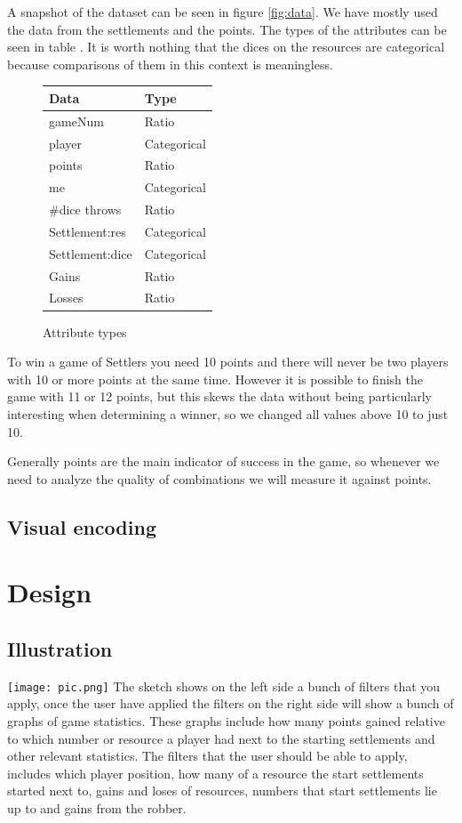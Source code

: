 \documentclass{article}
\begin{document}
A snapshot of the dataset can be seen in figure \ref{fig:data}. We have mostly
used the data from the settlements and the points. The types of the attributes
can be seen in table . It is worth nothing that the dices on
the resources are categorical because comparisons of them in this context is
meaningless. 

\begin{figure}
  \centering
  \begin{tabular}{|l|l|}
    Data & Type \\ \hline
    gameNum & Ratio \\ \hline
    player & Categorical \\ \hline
    points & Ratio \\ \hline
    me & Categorical \\ \hline
    #dice throws & Ratio \\ \hline
    Settlement:res & Categorical \\ \hline
    Settlement:dice & Categorical \\ \hline
    Gains & Ratio\\ \hline
    Losses & Ratio \\ \hline
  \end{tabular}
  \caption{Attribute types}
  \label{tab:types}
\end{figure}


To win a game of Settlers you need 10 points and there will never be two
players with 10 or more points at the same time. However it is possible to
finish the game with 11 or 12 points, but this skews the data without being
particularly interesting when determining a winner, so we changed all values
above 10 to just 10.

Generally points are the main indicator of success in the game, so whenever we
need to analyze the quality of combinations we will measure it against points.

\subsection{Visual encoding}

\section{Design}

\subsection{Illustration}
\texttt{[image: pic.png]}
\newpage
\noindent
The sketch shows on the left side a bunch of filters that you apply, once the user
have applied the filters on the right side will show a bunch of graphs of game statistics.
These graphs include how many points gained relative to which number or resource a player
had next to the starting settlements and other relevant statistics.
The filters that the user should be able to apply, includes which player position,
how many of a resource the start settlements started next to, gains and loses of resources,
numbers that start settlements lie up to and gains from the robber.
\end{document}
